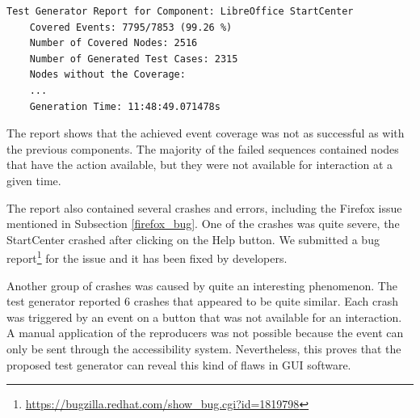 \begin{minipage}{\linewidth}
\begin{lstlisting}[caption={Final test generator report for LibreOffice StartCenter},label={libreoffice-report}]
    Test Generator Report for Component: LibreOffice StartCenter
    Covered Events: 7795/7853 (99.26 %) 
    Number of Covered Nodes: 2516
    Number of Generated Test Cases: 2315
    Nodes without the Coverage:
    ...
    Generation Time: 11:48:49.071478s
\end{lstlisting}
\end{minipage}

The report shows that the achieved event coverage was not as successful as with the previous components. The majority of the failed sequences contained nodes that have the action available, but they were not available for interaction at a given time. 

The report also contained several crashes and errors, including the Firefox issue mentioned in Subsection \ref{firefox_bug}. One of the crashes was quite severe, the StartCenter crashed after clicking on the Help button. We submitted a bug report\footnote{\url{https://bugzilla.redhat.com/show_bug.cgi?id=1819798}} for the issue and it has been fixed by developers. 

Another group of crashes was caused by quite an interesting phenomenon. The test generator reported 6 crashes that appeared to be quite similar. Each crash was triggered by an event on a button that was not available for an interaction. A manual application of the reproducers was not possible because the event can only be sent through the accessibility system. Nevertheless, this proves that the proposed test generator can reveal this kind of flaws in GUI software.




